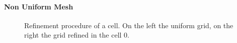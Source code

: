 \documentclass[11pt,a4paper]{article}
\begin{document}
\paragraph{Non Uniform Mesh}
\begin{figure}\captionsetup[subfloat]{labelformat=empty}
	\caption{Refinement procedure of a cell. On the left the uniform grid, on the right the grid refined in the cell 0.}
	\label{fig:octant_refinement}
\end{figure}\captionsetup[subfloat]{labelformat=parens}
\end{document}
